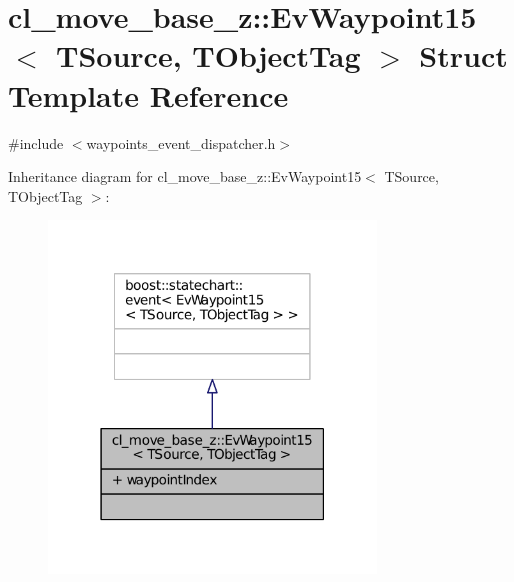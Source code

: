 \hypertarget{structcl__move__base__z_1_1EvWaypoint15}{}\section{cl\+\_\+move\+\_\+base\+\_\+z\+:\+:Ev\+Waypoint15$<$ T\+Source, T\+Object\+Tag $>$ Struct Template Reference}
\label{structcl__move__base__z_1_1EvWaypoint15}


{\ttfamily \#include $<$waypoints\+\_\+event\+\_\+dispatcher.\+h$>$}



Inheritance diagram for cl\+\_\+move\+\_\+base\+\_\+z\+:\+:Ev\+Waypoint15$<$ T\+Source, T\+Object\+Tag $>$\+:
\nopagebreak
\begin{figure}[H]
\begin{center}
\leavevmode
\includegraphics[width=247pt]{structcl__move__base__z_1_1EvWaypoint15__inherit__graph}
\end{center}
\end{figure}


